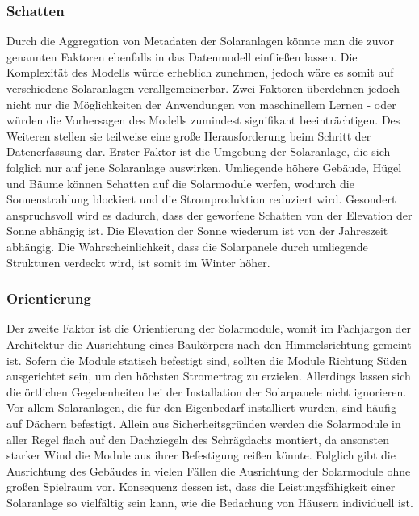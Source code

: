 \documentclass[12pt, a4paper]{article}
\begin{document}
\subsubsection{Schatten}

Durch die Aggregation von Metadaten der Solaranlagen könnte man die zuvor genannten Faktoren ebenfalls in das Datenmodell einfließen lassen. Die Komplexität des Modells würde erheblich zunehmen, jedoch wäre es somit auf verschiedene Solaranlagen verallgemeinerbar. Zwei Faktoren überdehnen jedoch nicht nur die Möglichkeiten der Anwendungen von maschinellem Lernen - oder würden die Vorhersagen des Modells zumindest signifikant beeinträchtigen. Des Weiteren stellen sie teilweise eine große Herausforderung beim Schritt der Datenerfassung dar. Erster Faktor ist die Umgebung der Solaranlage, die sich folglich nur auf jene Solaranlage auswirken. Umliegende höhere Gebäude, Hügel und Bäume können Schatten auf die Solarmodule werfen, wodurch die Sonnenstrahlung blockiert und die Stromproduktion reduziert wird. Gesondert anspruchsvoll wird es dadurch, dass der geworfene Schatten von der Elevation der Sonne abhängig ist. Die Elevation der Sonne wiederum ist von der Jahreszeit abhängig. Die Wahrscheinlichkeit, dass die Solarpanele durch umliegende Strukturen verdeckt wird, ist somit im Winter höher. 

\subsubsection{Orientierung}

Der zweite Faktor ist die Orientierung der Solarmodule, womit im Fachjargon der Architektur die Ausrichtung eines Baukörpers nach den Himmelsrichtung gemeint ist. Sofern die Module statisch befestigt sind, sollten die Module Richtung Süden ausgerichtet sein, um den höchsten Stromertrag zu erzielen. Allerdings lassen sich die örtlichen Gegebenheiten bei der Installation der Solarpanele nicht ignorieren. Vor allem Solaranlagen, die für den Eigenbedarf installiert wurden, sind häufig auf Dächern befestigt. Allein aus Sicherheitsgründen werden die Solarmodule in aller Regel flach auf den Dachziegeln des Schrägdachs montiert, da ansonsten starker Wind die Module aus ihrer Befestigung reißen könnte. Folglich gibt die Ausrichtung des Gebäudes in vielen Fällen die Ausrichtung der Solarmodule ohne großen Spielraum vor. Konsequenz dessen ist, dass die Leistungsfähigkeit einer Solaranlage so vielfältig sein kann, wie die Bedachung von Häusern individuell ist.
\end{document}
